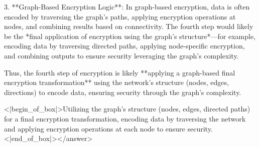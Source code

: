 3. **Graph-Based Encryption Logic**: In graph-based encryption, data is often encoded by traversing the graph’s paths, applying encryption operations at nodes, and combining results based on connectivity. The fourth step would likely be the *final application of encryption using the graph’s structure*—for example, encoding data by traversing directed paths, applying node-specific encryption, and combining outputs to ensure security leveraging the graph’s complexity.  


Thus, the fourth step of encryption is likely **applying a graph-based final encryption transformation** using the network’s structure (nodes, edges, directions) to encode data, ensuring security through the graph’s complexity.  

<|begin_of_box|>Utilizing the graph’s structure (nodes, edges, directed paths) for a final encryption transformation, encoding data by traversing the network and applying encryption operations at each node to ensure security.<|end_of_box|></answer>